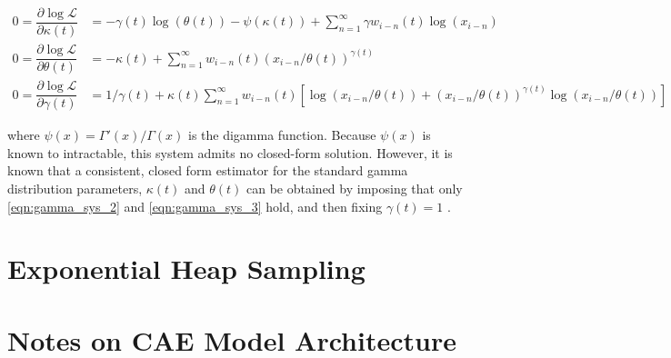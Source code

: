 \documentclass[12pt]{article}
\begin{document}
\begin{align}
0 = \dfrac{\partial \log\mathcal{L}}{\partial \kappa(t)} &= -\gamma(t)\log(\theta(t)) - \psi(\kappa(t)) + \sum_{n=1}^\infty \gamma w_{i-n}(t) \log(x_{i-n})  \label{eqn:gamma_sys_1}\\
0 = \dfrac{\partial \log\mathcal{L}}{\partial \theta(t)} &= -\kappa(t) + \sum_{n=1}^\infty w_{i-n}(t) (x_{i-n}/\theta(t))^{\gamma(t)} \label{eqn:gamma_sys_2}\\
0 = \dfrac{\partial \log\mathcal{L}}{\partial \gamma(t)} &= 1/\gamma(t) + \kappa(t)\sum_{n=1}^\infty w_{i-n}(t)\left[ \log(x_{i-n}/\theta(t)) + (x_{i-n}/\theta(t))^{\gamma(t)}\log(x_{i-n}/\theta(t)) \right] \label{eqn:gamma_sys_3}
\end{align}

\noindent where $\psi(x) = \Gamma'(x)/\Gamma(x)$ is the digamma function. Because $\psi(x)$ is known to intractable, this system admits no closed-form solution. However, it is known that a consistent, closed form estimator for the standard gamma distribution parameters, $\kappa(t)$ and $\theta(t)$ can be obtained by imposing that only \eqref{eqn:gamma_sys_2} and \eqref{eqn:gamma_sys_3} hold, and then fixing $\gamma(t) = 1$ \cite{gammapaper}. 

\section{Exponential Heap Sampling}

\section{Notes on CAE Model Architecture}\label{appendix:cae}
\end{document}

